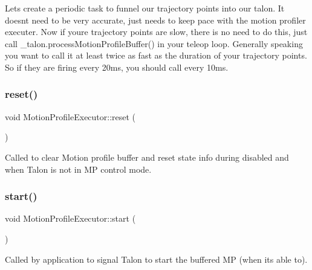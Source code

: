 Lets create a periodic task to funnel our trajectory points into our talon. It doesn\textquotesingle{}t need to be very accurate, just needs to keep pace with the motion profiler executer. Now if you\textquotesingle{}re trajectory points are slow, there is no need to do this, just call \+\_\+talon.\+process\+Motion\+Profile\+Buffer() in your teleop loop. Generally speaking you want to call it at least twice as fast as the duration of your trajectory points. So if they are firing every 20ms, you should call every 10ms. \mbox{\label{class_motion_profile_executor_a3e94905fe37d30840822bd819978b79d}} 
\subsubsection{\texorpdfstring{reset()}{reset()}}
{\footnotesize\ttfamily void Motion\+Profile\+Executor\+::reset (\begin{DoxyParamCaption}{ }\end{DoxyParamCaption})\hspace{0.3cm}{\ttfamily [inline]}}

Called to clear Motion profile buffer and reset state info during disabled and when Talon is not in MP control mode. \mbox{\label{class_motion_profile_executor_a49d7debb97c9c722ee8fc2f6d43d21ca}} 
\subsubsection{\texorpdfstring{start()}{start()}}
{\footnotesize\ttfamily void Motion\+Profile\+Executor\+::start (\begin{DoxyParamCaption}{ }\end{DoxyParamCaption})\hspace{0.3cm}{\ttfamily [inline]}}

Called by application to signal Talon to start the buffered MP (when it\textquotesingle{}s able to). \mbox{\label{class_motion_profile_executor_a16ef527ec6fea68ae7ac06785ddb3b7c}} 
